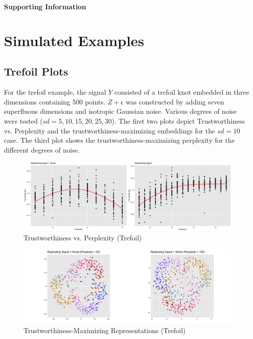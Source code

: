 \documentclass{article}
\begin{document}
\clearpage
\begin{center}
\textbf{\large Supporting Information}
\end{center}

\setcounter{section}{0}
\setcounter{figure}{0}
\renewcommand{\thesection}{S\Roman{section}}
\renewcommand{\thefigure}{S\arabic{figure}}

\section{Simulated Examples}
\subsection{Trefoil Plots}
For the trefoil example, the signal $Y$ consisted of a trefoil knot embedded in three dimensions containing 500 points. $Z + \epsilon$ was constructed by adding seven superfluous dimensions and isotropic Gaussian noise. Various degrees of noise were tested ($sd = 5, 10, 15, 20, 25, 30$). The first two plots depict Trustworthiness vs. Perplexity and the trustworthiness-maximizing embeddings for the $sd = 10$ case. The third plot shows the trustworthiness-maximizing perplexity for the different degrees of noise.

\begin{figure}[H]
\centering
\includegraphics[scale=0.2]{trust_plot_trefoil}
\caption{Trustworthiness vs. Perplexity (Trefoil)}
\end{figure}

\begin{figure}[H]
\centering
\includegraphics[scale=0.28]{best_rep_trefoil}
\caption{Trustworthiness-Maximizing Representations (Trefoil)}
\end{figure}
\end{document}
